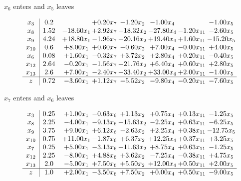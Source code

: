 \documentclass[9pt]{article}
\begin{document}
 $ x_{6} $ enters and $ x_{5} $ leaves 

 \[\begin{array}{c| c c@{\hskip 2pt} c@{\hskip 2pt} c@{\hskip 2pt} c@{\hskip 2pt} c@{\hskip 2pt} c@{\hskip 2pt} }
 x_{3}   &  0.2  &   & +  0.20 x_{7} & -1.20 x_{2} & -1.00 x_{4} &   & -1.00 x_{5}\\
 x_{8}   &  1.52 & -18.60 x_{1} & +  2.92 x_{7} & -18.32 x_{2} & -27.80 x_{4} & -1.20 x_{11} & -2.60 x_{5}\\
 x_{9}   &  4.24 & + 18.80 x_{1} & -1.96 x_{7} & + 20.16 x_{2} & + 19.40 x_{4} & +  1.60 x_{11} & -15.20 x_{5}\\
 x_{10}   &  0.6 & +  8.00 x_{1} & +  0.60 x_{7} & -0.60 x_{2} & +  7.00 x_{4} & -0.00 x_{11} & +  4.00 x_{5}\\
 x_{6}   &  0.08 & +  1.60 x_{1} & -0.32 x_{7} & +  3.72 x_{2} & +  2.80 x_{4} & +  0.20 x_{11} & -0.40 x_{5}\\
 x_{12}   &  2.64 & -0.20 x_{1} & -1.56 x_{7} & + 21.76 x_{2} & +  6.40 x_{4} & +  0.60 x_{11} & +  2.80 x_{5}\\
 x_{13}   &  2.6 & +  7.00 x_{1} & -2.40 x_{7} & + 33.40 x_{2} & + 33.00 x_{4} & +  2.00 x_{11} & -1.00 x_{5}\\
\hline
z    &  0.72 & -3.60 x_{1} & +  1.12 x_{7} & -5.52 x_{2} & -9.80 x_{4} & -0.20 x_{11} & -7.60 x_{5}\\
\end{array}\]


 $ x_{7} $ enters and $ x_{6} $ leaves 

 \[\begin{array}{c| c c@{\hskip 2pt} c@{\hskip 2pt} c@{\hskip 2pt} c@{\hskip 2pt} c@{\hskip 2pt} c@{\hskip 2pt} }
 x_{3}   &  0.25 & +  1.00 x_{1} & -0.63 x_{6} & +  1.13 x_{2} & +  0.75 x_{4} & +  0.13 x_{11} & -1.25 x_{5}\\
 x_{8}   &  2.25 & -4.00 x_{1} & -9.13 x_{6} & + 15.63 x_{2} & -2.25 x_{4} & +  0.63 x_{11} & -6.25 x_{5}\\
 x_{9}   &  3.75 & +  9.00 x_{1} & +  6.12 x_{6} & -2.63 x_{2} & +  2.25 x_{4} & +  0.38 x_{11} & -12.75 x_{5}\\
 x_{10}   &  0.75 & + 11.00 x_{1} & -1.87 x_{6} & +  6.37 x_{2} & + 12.25 x_{4} & +  0.37 x_{11} & +  3.25 x_{5}\\
 x_{7}   &  0.25 & +  5.00 x_{1} & -3.13 x_{6} & + 11.63 x_{2} & +  8.75 x_{4} & +  0.63 x_{11} & -1.25 x_{5}\\
 x_{12}   &  2.25 & -8.00 x_{1} & +  4.88 x_{6} & +  3.62 x_{2} & -7.25 x_{4} & -0.38 x_{11} & +  4.75 x_{5}\\
 x_{13}   &  2.0 & -5.00 x_{1} & +  7.50 x_{6} & +  5.50 x_{2} & + 12.00 x_{4} & +  0.50 x_{11} & +  2.00 x_{5}\\
\hline
z    &  1.0 & +  2.00 x_{1} & -3.50 x_{6} & +  7.50 x_{2} & +  0.00 x_{4} & +  0.50 x_{11} & -9.00 x_{5}\\
\end{array}\]
\end{document}
